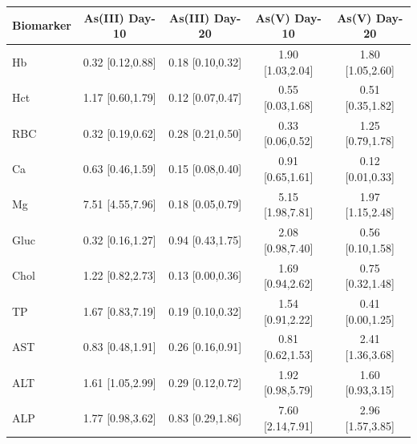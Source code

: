 \begin{tabular}{lcccc}
  \toprule
  Biomarker & As(III) Day-10 & As(III) Day-20 & As(V) Day-10 & As(V) Day-20 \\
  \midrule
  Hb & 0.32 [0.12,0.88] & 0.18 [0.10,0.32] & 1.90 [1.03,2.04] & 1.80 [1.05,2.60] \\
  Hct & 1.17 [0.60,1.79] & 0.12 [0.07,0.47] & 0.55 [0.03,1.68] & 0.51 [0.35,1.82] \\
  RBC & 0.32 [0.19,0.62] & 0.28 [0.21,0.50] & 0.33 [0.06,0.52] & 1.25 [0.79,1.78] \\
  Ca & 0.63 [0.46,1.59] & 0.15 [0.08,0.40] & 0.91 [0.65,1.61] & 0.12 [0.01,0.33] \\
  Mg & 7.51 [4.55,7.96] & 0.18 [0.05,0.79] & 5.15 [1.98,7.81] & 1.97 [1.15,2.48] \\
  Gluc & 0.32 [0.16,1.27] & 0.94 [0.43,1.75] & 2.08 [0.98,7.40] & 0.56 [0.10,1.58] \\
  Chol & 1.22 [0.82,2.73] & 0.13 [0.00,0.36] & 1.69 [0.94,2.62] & 0.75 [0.32,1.48] \\
  TP & 1.67 [0.83,7.19] & 0.19 [0.10,0.32] & 1.54 [0.91,2.22] & 0.41 [0.00,1.25] \\
  AST & 0.83 [0.48,1.91] & 0.26 [0.16,0.91] & 0.81 [0.62,1.53] & 2.41 [1.36,3.68] \\
  ALT & 1.61 [1.05,2.99] & 0.29 [0.12,0.72] & 1.92 [0.98,5.79] & 1.60 [0.93,3.15] \\
  ALP & 1.77 [0.98,3.62] & 0.83 [0.29,1.86] & 7.60 [2.14,7.91] & 2.96 [1.57,3.85] \\
  \bottomrule
\end{tabular}
